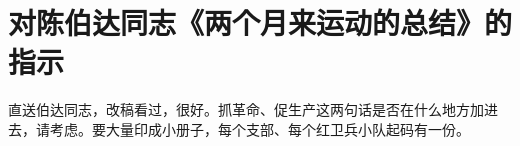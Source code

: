 \section[对陈伯达同志《两个月来运动的总结》的指示（一九六六年十月二十四日）]{对陈伯达同志《两个月来运动的总结》的指示}


直送伯达同志，改稿看过，很好。抓革命、促生产这两句话是否在什么地方加进去，请考虑。要大量印成小册子，每个支部、每个红卫兵小队起码有一份。


